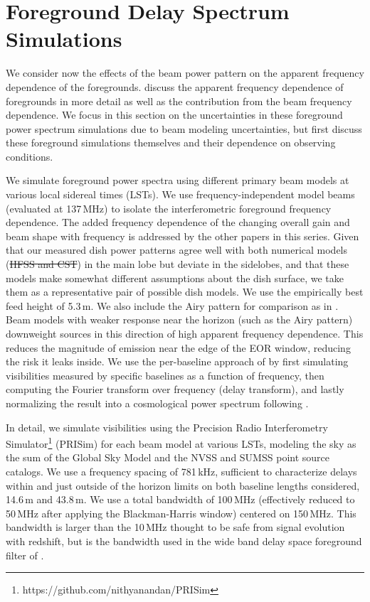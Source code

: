 \documentclass{emulateapj}
\providecommand{\DIFadd}[1]{{\protect\color{blue}\uwave{#1}}} %
\providecommand{\DIFdel}[1]{{\protect\color{red}\sout{#1}}}                      %
\providecommand{\DIFaddbegin}{} %
\providecommand{\DIFaddend}{} %
\providecommand{\DIFdelbegin}{} %
\providecommand{\DIFdelend}{} %
\begin{document}
\section{Foreground Delay Spectrum Simulations}
\label{sec:foregrounds}

We consider now the effects of the beam power pattern on the apparent frequency dependence of the foregrounds. \citet{nithya16} discuss the apparent frequency dependence of foregrounds in more detail as well as the contribution from the beam frequency dependence. We focus in this section on the uncertainties in these foreground power spectrum simulations due to beam modeling uncertainties, but first discuss these foreground simulations themselves and their dependence on observing conditions. 

We simulate foreground power spectra using different primary beam models at various local sidereal times (LSTs). We use frequency-independent model beams (evaluated at 137\,MHz) to isolate the interferometric foreground frequency dependence. The added frequency dependence of the changing overall gain and beam shape with frequency is addressed by the other papers in this series. Given that our measured dish power patterns agree well with both numerical models (\DIFdelbegin \DIFdel{HFSS and CST}\DIFdelend \DIFaddbegin \DIFadd{full-faceted and perfect paraboloid}\DIFaddend ) in the main lobe but deviate in the sidelobes, and that these models make somewhat different assumptions about the dish surface, we take them as a representative pair of possible dish models. We use the empirically best feed height of 5.3\,m. We also include the Airy pattern for comparison as in \citet{nithya15}. Beam models with weaker response near the horizon (such as the Airy pattern) downweight sources in this direction of high apparent frequency dependence. This reduces the magnitude of emission near the edge of the EOR window, reducing the risk it leaks inside. We use the per-baseline approach of \citet{parsons12a,parsons12b} by first simulating visibilities measured by specific baselines as a function of frequency, then computing the Fourier transform over frequency (delay transform), and lastly normalizing the result into a cosmological power spectrum following \citet{nithya15}. 

In detail, we simulate visibilities using the Precision Radio Interferometry Simulator\footnote{https://github.com/nithyanandan/PRISim} (PRISim) for each beam model at various LSTs, modeling the sky as the sum of the Global Sky Model \citep{gsm} and the NVSS \citep{nvss} and SUMSS \citep{sumss,sumss2} point source catalogs. We use a frequency spacing of 781\,kHz, sufficient to characterize delays within and just outside of the horizon limits on both baseline lengths considered, 14.6\,m and 43.8\,m. We use a total bandwidth of 100\,MHz (effectively reduced to 50\,MHz after applying the Blackman-Harris window) centered on 150\,MHz. This bandwidth is larger than the 10\,MHz thought to be safe from signal evolution with redshift, but is the bandwidth used in the wide band delay space foreground filter of \citet{paper32,ali2015}.
\end{document}
